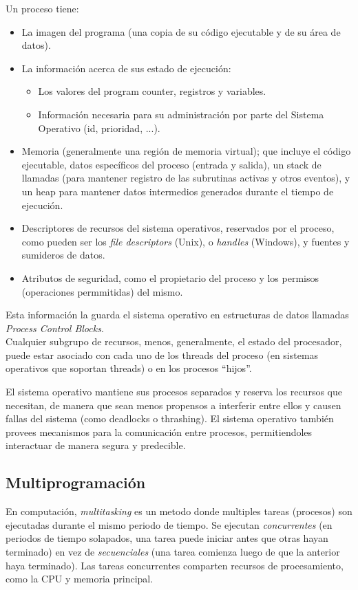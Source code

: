 \documentclass[a4paper, twoside]{article}
\begin{document}
Un proceso tiene:
\begin{itemize}
	\item La imagen del programa (una copia de su código ejecutable y de su área de datos).
	\item La información acerca de sus estado de ejecución:
	\begin{itemize}
		\item Los valores del program counter, registros y variables.
		\item Información necesaria para su administración por parte del Sistema Operativo (id, prioridad, ...).
	\end{itemize}
	\item Memoria (generalmente una región de memoria virtual); que incluye el código ejecutable, datos específicos del proceso (entrada y salida), un stack de llamadas (para mantener registro de las subrutinas activas y otros eventos), y un heap para mantener datos intermedios generados durante el tiempo de ejecución.
	\item Descriptores de recursos del sistema operativos, reservados por el proceso, como pueden ser los \emph{file descriptors} (Unix), o \emph{handles} (Windows), y fuentes y sumideros de datos.
	\item Atributos de seguridad, como el propietario del proceso y los permisos (operaciones permmitidas) del mismo.
\end{itemize}

Esta información la guarda el sistema operativo en estructuras de datos llamadas \emph{Process Control Blocks}.\\

Cualquier subgrupo de recursos, menos, generalmente, el estado del procesador, puede estar asociado con cada uno de los threads del proceso (en sistemas operativos que soportan threads) o en los procesos ``hijos''.

El sistema operativo mantiene sus procesos separados y reserva los recursos que necesitan, de manera que sean menos propensos a interferir entre ellos y causen fallas del sistema (como deadlocks o thrashing). El sistema operativo también provees mecanismos para la comunicación entre procesos, permitiendoles interactuar de manera segura y predecible.

\subsection{Multiprogramación}
En computación, \emph{multitasking} es un metodo donde multiples tareas (procesos) son ejecutadas durante el mismo periodo de tiempo. Se ejecutan \emph{concurrentes} (en periodos de tiempo solapados, una tarea puede iniciar antes que otras hayan terminado) en vez de \emph{secuenciales} (una tarea comienza luego de que la anterior haya terminado). Las tareas concurrentes comparten recursos de procesamiento, como la CPU y memoria principal.\\
\end{document}
